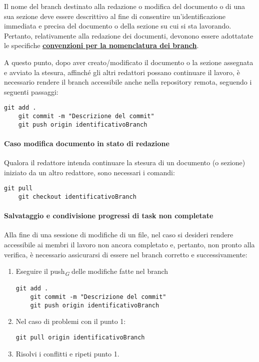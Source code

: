 Il nome del branch destinato alla redazione o modifica del documento o di una sua sezione deve essere descrittivo al fine di consentire un'identificazione immediata e precisa del documento o della sezione su cui si sta lavorando. Pertanto, relativamente alla redazione dei documenti, devonono essere adottatate le specifiche \hyperlink{par:convezioninomenclaturabranchdocumenti}{\textbf{convenzioni per la nomenclatura dei branch}}.

A questo punto, dopo aver creato/modificato il documento o la sezione assegnata e avviato la stesura, affinché gli altri redattori possano continuare il lavoro, è necessario rendere il branch accessibile anche nella repository remota, seguendo i seguenti passaggi:
\begin{lstlisting}[style=code]
    git add .
    git commit -m "Descrizione del commit"
    git push origin identificativoBranch
\end{lstlisting}

\paragraph*{\textbf{Caso modifica documento in stato di redazione}}
Qualora il redattore intenda continuare la stesura di un documento (o sezione) iniziato da un altro redattore, sono necessari i comandi:
\begin{lstlisting}[style=code]
    git pull
    git checkout identificativoBranch
\end{lstlisting}

\hypertarget{par:salvataggioecondivisioneprogressitasknoncompletate}{\paragraph*{{\textbf{Salvataggio e condivisione progressi di task non completate}}}}
Alla fine di una sessione di modifiche di un file, nel caso si desideri rendere accessibile ai membri il lavoro non ancora completato e, pertanto, non pronto alla verifica, è necessario assicurarsi di essere nel branch corretto e successivamente:
\begin{enumerate}
    \item Eseguire il push\textsubscript{\textit{G}}  delle modifiche fatte nel branch
          \begin{lstlisting}[style=code]
    git add .
    git commit -m "Descrizione del commit"
    git push origin identificativoBranch
        \end{lstlisting}

    \item Nel caso di problemi con il punto 1:
          \begin{lstlisting}[style=code]
   git pull origin identificativoBranch
        \end{lstlisting}
    \item Risolvi i conflitti e ripeti punto 1.
\end{enumerate}

